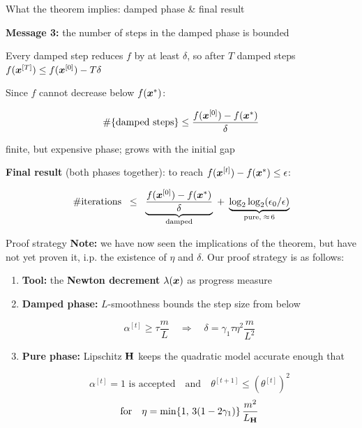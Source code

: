 \documentclass[11pt,compress,t,notes=noshow, xcolor=table]{beamer}
\newcommand{\LH}{L_{\H}}
\begin{document}
\begin{framei}[fs=small]{What the theorem implies: damped phase \& final result}
\item \textbf{Message 3:} the number of steps in the damped phase is bounded
\begin{itemizeM}
\item Every damped step reduces $f$ by at least $\delta$, so after $T$ damped steps
$f(\bm{x}^{[T]}) \le f(\bm{x}^{[0]}) - T \delta$
\item Since $f$ cannot decrease below $f(\bm{x}^\ast)$:
\begin{framed}
$$\#\{\text{damped steps}\} \le \frac{f(\bm{x}^{[0]}) - f(\bm{x}^\ast)}{\delta}$$
\end{framed}
\item[$\Rightarrow$] finite, but expensive phase; grows with the initial gap
\end{itemizeM}
\item \textbf{Final result} (both phases together): to reach $f(\bm{x}^{[t]}) - f(\bm{x}^\ast) \le \epsilon$:
\begin{framed}
$$\#\text{iterations} \;\; \le \;\;
\underbrace{\frac{f(\bm{x}^{[0]}) - f(\bm{x}^\ast)}{\delta}}_{\text{damped}} \; + \;
\underbrace{\log_2 \log_2 (\epsilon_0/\epsilon)}_{\text{pure}, \; \approx \, 6}$$
\end{framed}
\end{framei}


\begin{framev}[fs=small]{Proof strategy}
\textbf{Note:} we have now seen the implications of the theorem, but have not yet proven it, i.p. the existence of $\eta$ and $\delta$. Our proof strategy is as follows:
\begin{enumerate}
\item \textbf{Tool:} the \textbf{Newton decrement} $\lambda(\bm{x})$ as progress measure
\item \textbf{Damped phase:} $L$-smoothness bounds the step size from below
\begin{framed}
$$\alpha^{[t]} \ge \tau \frac{m}{L}
\quad \Longrightarrow \quad
\delta = \gamma_1 \tau \eta^2 \frac{m}{L^2}$$
\end{framed}
\item \textbf{Pure phase:} Lipschitz $\mathbf{H}$ keeps the quadratic model accurate enough that
\begin{framed}
$$\alpha^{[t]} = 1 \text{ is accepted}
\quad \text{and} \quad
\theta^{[t+1]} \le (\theta^{[t]})^2$$
$$\text{for} \quad \eta = \min\{1, \, 3(1 - 2\gamma_1)\} \, \frac{m^2}{\LH}$$
\end{framed}
\end{enumerate}
\end{framev}
\end{document}
